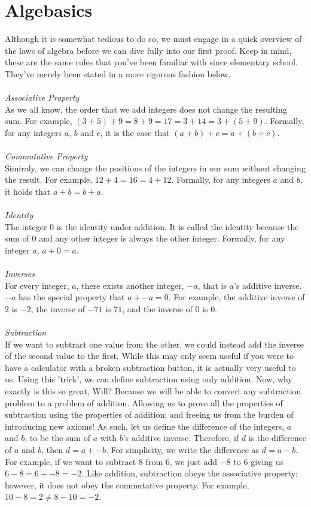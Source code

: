 \documentclass[a4paper,12pt]{article}
\begin{document}
\section{Algebasics}
Although it is somewhat tedious to do so, we must engage in a quick overview of the laws of algebra before we can dive fully into our first proof. Keep in mind, these are the same rules that you've been familiar with since elementary school. They've merely been stated in a more rigorous fashion below.\\
\\
\textit{Associative Property}\\
As we all know, the order that we add integers does not change the resulting sum. For example, $(3 + 5) + 9 = 8 + 9 = 17 = 3 + 14 = 3 + (5 + 9)$. Formally, for any integers $a$, $b$ and $c$, it is the case that $(a + b) + c = a + (b + c)$.\\
\\
\textit{Commutative Property}\\
Simiraly, we can change the positions of the integers in our sum without changing the result. For example, $12 + 4 = 16 = 4 + 12$. Formally, for any integers $a$ and $b$, it holds that $a + b = b + a$.\\
\\
\textit{Identity}\\
The integer $0$ is the identity under addition. It is called the identity because the sum of $0$ and any other integer is always the other integer. Formally, for any integer $a$, $a + 0 = a$.\\
\\
\textit{Inverses}\\
For every integer, $a$, there exists another integer, $-a$, that is $a$'s additive inverse. $-a$ has the special property that $a + -a = 0$. For example, the additive inverse of $2$ is $-2$, the inverse of $-71$ is $71$, and the inverse of $0$ is $0$.\\ 
\\
\textit{Subtraction}\\
If we want to subtract one value from the other, we could instead add the inverse of the second value to the first. While this may only seem useful if you were to have a calculator with a broken subtraction button, it is actually very useful to us. Using this 'trick', we can define subtraction using only addition. Now, why exactly is this so great, Will? Because we will be able to convert any subtraction problem to a problem of addition. Allowing us to prove all the properties of subtraction using the properties of addition; and freeing us from the burden of introducing new axioms! As such, let us define the difference of the integers, $a$ and $b$, to be the sum of $a$ with $b$'s additive inverse. Therefore, if $d$ is the difference of $a$ and $b$, then $d= a + -b$. For simplicity, we write the difference as $d = a - b$. For example, if we want to subtract $8$ from $6$, we just add $-8$ to $6$ giving us $6 - 8 = 6 + -8 = -2$. Like addition, subtraction obeys the associative property; however, it does not obey the commutative property. For example, $10 - 8 = 2 \neq 8 - 10 = -2$.\\
\end{document}
